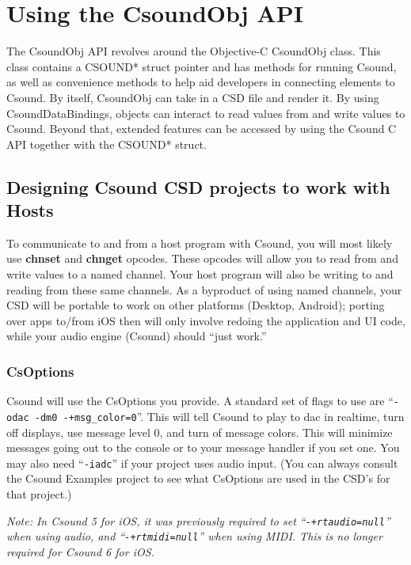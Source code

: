 \documentclass[11pt]{article}
\begin{document}
\section{Using the CsoundObj API}

The CsoundObj API revolves around the Objective-C CsoundObj class. This class contains a CSOUND* struct pointer and has methods for running Csound, as well as convenience methods to help aid developers in connecting elements to Csound. By itself, CsoundObj can take in a CSD file and render it.  By using CsoundDataBindings, objects can interact to read values from and write values to Csound.  Beyond that, extended features can be accessed by using the Csound C API together with the CSOUND* struct.

\subsection{Designing Csound CSD projects to work with Hosts}

To communicate to and from a host program with Csound, you will most likely use \textbf{chnset} and \textbf{chnget} opcodes. These opcodes will allow you to read from and write values to a named channel.  Your host program will also be writing to and reading from these same channels.  As a byproduct of using named channels, your CSD will be portable to work on other platforms (Desktop, Android); porting over apps to/from iOS then will only involve redoing the application and UI code, while your audio engine (Csound) should ``just work.''

\subsubsection{CsOptions}

Csound will use the CsOptions you provide.  A standard set of flags to use are ``{\tt -odac -dm0 -+msg\_color=0}''. This will tell Csound to play to dac in realtime, turn off displays, use message level 0, and turn of message colors.  This will minimize messages going out to the console or to your message handler if you set one.  You may also need ``{\tt -iadc}'' if your project uses audio input. (You can always consult the Csound Examples project to see what CsOptions are used in the CSD's for that project.)

\emph{Note: In Csound 5 for iOS, it was previously required to set \linebreak ``{\tt -+rtaudio=null}'' when using audio, and ``{\tt -+rtmidi=null}'' when using MIDI. This is no longer required for Csound 6 for iOS.}
\end{document}
